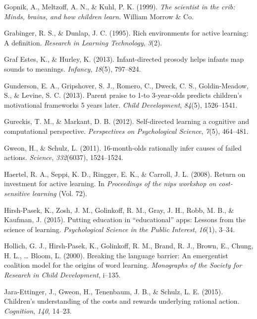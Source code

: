 \documentclass[english,floatsintext,man]{apa6}
\theoremstyle{definition}
\theoremstyle{definition}
\theoremstyle{definition}
\theoremstyle{remark}
\begin{document}
\hypertarget{ref-gopnik1999scientist}{}
Gopnik, A., Meltzoff, A. N., \& Kuhl, P. K. (1999). \emph{The scientist
in the crib: Minds, brains, and how children learn.} William Morrow \&
Co.

\hypertarget{ref-grabinger1995rich}{}
Grabinger, R. S., \& Dunlap, J. C. (1995). Rich environments for active
learning: A definition. \emph{Research in Learning Technology},
\emph{3}(2).

\hypertarget{ref-graf2013infant}{}
Graf Estes, K., \& Hurley, K. (2013). Infant-directed prosody helps
infants map sounds to meanings. \emph{Infancy}, \emph{18}(5), 797--824.

\hypertarget{ref-gunderson2013parent}{}
Gunderson, E. A., Gripshover, S. J., Romero, C., Dweck, C. S.,
Goldin-Meadow, S., \& Levine, S. C. (2013). Parent praise to 1-to
3-year-olds predicts children's motivational frameworks 5 years later.
\emph{Child Development}, \emph{84}(5), 1526--1541.

\hypertarget{ref-gureckis2012self}{}
Gureckis, T. M., \& Markant, D. B. (2012). Self-directed learning a
cognitive and computational perspective. \emph{Perspectives on
Psychological Science}, \emph{7}(5), 464--481.

\hypertarget{ref-gweon201116}{}
Gweon, H., \& Schulz, L. (2011). 16-month-olds rationally infer causes
of failed actions. \emph{Science}, \emph{332}(6037), 1524--1524.

\hypertarget{ref-haertel2008return}{}
Haertel, R. A., Seppi, K. D., Ringger, E. K., \& Carroll, J. L. (2008).
Return on investment for active learning. In \emph{Proceedings of the
nips workshop on cost-sensitive learning} (Vol. 72).

\hypertarget{ref-hirsh2015putting}{}
Hirsh-Pasek, K., Zosh, J. M., Golinkoff, R. M., Gray, J. H., Robb, M.
B., \& Kaufman, J. (2015). Putting education in ``educational'' apps:
Lessons from the science of learning. \emph{Psychological Science in the
Public Interest}, \emph{16}(1), 3--34.

\hypertarget{ref-hollich2000breaking}{}
Hollich, G. J., Hirsh-Pasek, K., Golinkoff, R. M., Brand, R. J., Brown,
E., Chung, H. L., \ldots{} Bloom, L. (2000). Breaking the language
barrier: An emergentist coalition model for the origins of word
learning. \emph{Monographs of the Society for Research in Child
Development}, i--135.

\hypertarget{ref-jara2015children}{}
Jara-Ettinger, J., Gweon, H., Tenenbaum, J. B., \& Schulz, L. E. (2015).
Children's understanding of the costs and rewards underlying rational
action. \emph{Cognition}, \emph{140}, 14--23.
\end{document}
